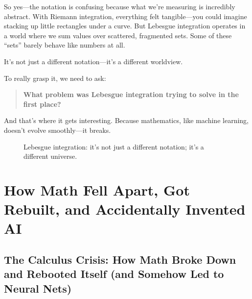 So yes—the notation is confusing because what we’re measuring is incredibly abstract. With Riemann integration, everything felt tangible—you could imagine stacking up little rectangles under a curve. But Lebesgue integration operates in a world where we sum values over scattered, fragmented sets. Some of these “sets” barely behave like numbers at all. 

It’s not just a different notation—it’s a different worldview.

To really grasp it, we need to ask:

\begin{quote}
\textbf{What problem was Lebesgue integration trying to solve in the first place?}
\end{quote}

And that’s where it gets interesting. Because mathematics, like machine learning, doesn’t evolve smoothly—it breaks.

\begin{figure}[H]
\centering
{}
\caption{Lebesgue integration: it’s not just a different notation; it’s a different universe.}
\end{figure}


\section{How Math Fell Apart, Got Rebuilt, and Accidentally Invented AI}

\subsection{The Calculus Crisis: How Math Broke Down and Rebooted Itself (and Somehow Led to Neural Nets)}

